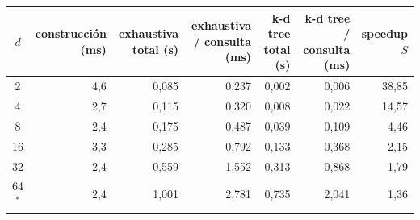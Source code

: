 \begin{tabular}{crrrrrr}
\toprule
$d$ & construcción (ms) & exhaustiva total (s) & exhaustiva / consulta (ms) & k-d tree total (s) & k-d tree / consulta (ms) & speedup $S$ \\
\midrule
2 & 4{,}6 & 0{,}085 & 0{,}237 & 0{,}002 & 0{,}006 & 38{,}85 \\
4 & 2{,}7 & 0{,}115 & 0{,}320 & 0{,}008 & 0{,}022 & 14{,}57 \\
8 & 2{,}4 & 0{,}175 & 0{,}487 & 0{,}039 & 0{,}109 & 4{,}46 \\
16 & 3{,}3 & 0{,}285 & 0{,}792 & 0{,}133 & 0{,}368 & 2{,}15 \\
32 & 2{,}4 & 0{,}559 & 1{,}552 & 0{,}313 & 0{,}868 & 1{,}79 \\
64$^{*}$ & 2{,}4 & 1{,}001 & 2{,}781 & 0{,}735 & 2{,}041 & 1{,}36 \\
\bottomrule
\end{tabular}
